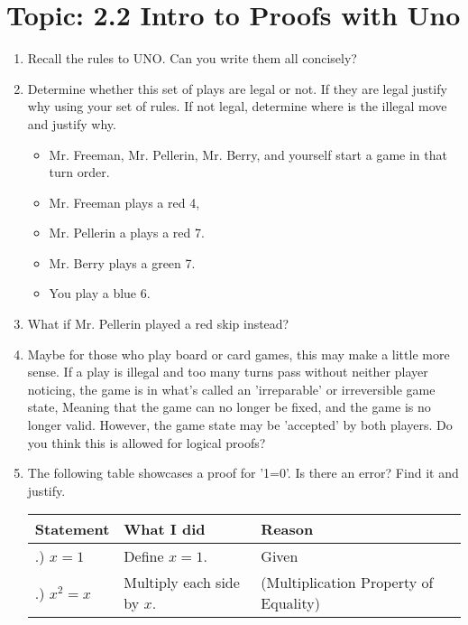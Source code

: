 \documentclass[12pt,letterpaper]{article}
\begin{document}
\section*{Topic: 2.2 Intro to Proofs with Uno}
\begin{enumerate}
    \item Recall the rules to UNO. Can you write them all concisely?
    \item Determine whether this set of plays are legal or not. If they are legal justify why using your set of rules. If not legal, determine where is the illegal move and justify why.
          \begin{itemize}
              \item Mr. Freeman, Mr. Pellerin, Mr. Berry, and yourself start a game in that turn order.
              \item Mr. Freeman plays a red 4,
              \item Mr. Pellerin a plays a red 7.
              \item Mr. Berry plays a green 7.
              \item You play a blue 6.
          \end{itemize}
    \item What if Mr. Pellerin played a red skip instead?
    \item Maybe for those who play board or card games, this may make a little more sense. If a play is illegal and too many turns pass without neither player noticing, the game is in what's called an 'irreparable' or irreversible game state, Meaning that the game can no longer be fixed, and the game is no longer valid. However, the game state may be 'accepted' by both players. Do you think this is allowed for logical proofs?
    \item The following table showcases a proof for '1=0'. Is there an error? Find it and justify.
          \begin{tabularx}{0.95\textwidth} {
                  | >{\raggedright\arraybackslash}X
                  | >{\centering\arraybackslash}X
                  | >{\raggedleft\arraybackslash}X |}
              \hline
              Statement      & What I did                      & Reason                                \\
              \hline
              1.) $x=1$      & Define $x=1$.                   & Given                                 \\
              \hline
              2.) $x^2=x$    & Multiply each side by $x$.      & (Multiplication Property of Equality) \\

\end{tabularx}
\end{enumerate}
\end{document}
